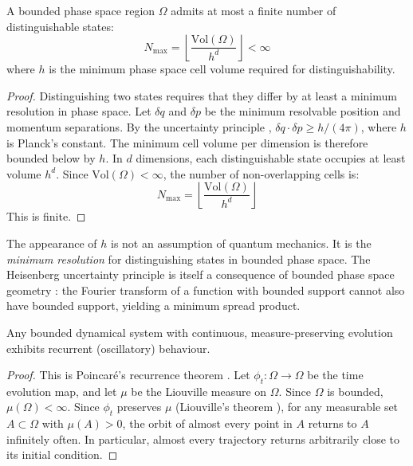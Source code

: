\begin{theorem}
\label{thm:finite_states}
A bounded phase space region $\Omega$ admits at most a finite number of distinguishable states:
\begin{equation}
    N_{\max} = \left\lfloor \frac{\mathrm{Vol}(\Omega)}{h^d} \right\rfloor < \infty
\end{equation}
where $h$ is the minimum phase space cell volume required for distinguishability.
\end{theorem}

\begin{proof}
Distinguishing two states requires that they differ by at least a minimum resolution in phase space. Let $\delta q$ and $\delta p$ be the minimum resolvable position and momentum separations. By the uncertainty principle \cite{heisenberg1927}, $\delta q \cdot \delta p \geq h/(4\pi)$, where $h$ is Planck's constant. The minimum cell volume per dimension is therefore bounded below by $h$. In $d$ dimensions, each distinguishable state occupies at least volume $h^d$. Since $\mathrm{Vol}(\Omega) < \infty$, the number of non-overlapping cells is:
\begin{equation}
    N_{\max} = \left\lfloor \frac{\mathrm{Vol}(\Omega)}{h^d} \right\rfloor
\end{equation}
This is finite.
\end{proof}

\begin{remark}
The appearance of $h$ is not an assumption of quantum mechanics. It is the \emph{minimum resolution} for distinguishing states in bounded phase space. The Heisenberg uncertainty principle is itself a consequence of bounded phase space geometry \cite{weyl1927}: the Fourier transform of a function with bounded support cannot also have bounded support, yielding a minimum spread product.
\end{remark}

\begin{theorem}
\label{thm:oscillation}
Any bounded dynamical system with continuous, measure-preserving evolution exhibits recurrent (oscillatory) behaviour.
\end{theorem}

\begin{proof}
This is Poincar\'{e}'s recurrence theorem \cite{poincare1890}. Let $\phi_t : \Omega \to \Omega$ be the time evolution map, and let $\mu$ be the Liouville measure on $\Omega$. Since $\Omega$ is bounded, $\mu(\Omega) < \infty$. Since $\phi_t$ preserves $\mu$ (Liouville's theorem \cite{liouville1838}), for any measurable set $A \subset \Omega$ with $\mu(A) > 0$, the orbit of almost every point in $A$ returns to $A$ infinitely often. In particular, almost every trajectory returns arbitrarily close to its initial condition.
\end{proof}

